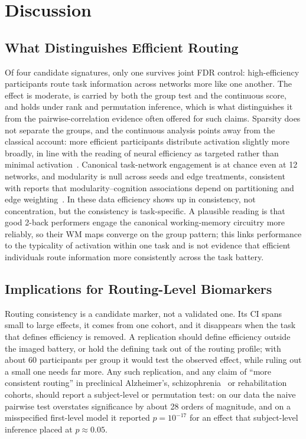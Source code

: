 \documentclass[conference]{IEEEtran}
\begin{document}
\section{Discussion}

\subsection{What Distinguishes Efficient Routing}

Of four candidate signatures, only one survives joint FDR control: high-efficiency participants route task information across networks more like one another. The effect is moderate, is carried by both the group test and the continuous score, and holds under rank and permutation inference, which is what distinguishes it from the pairwise-correlation evidence often offered for such claims. Sparsity does not separate the groups, and the continuous analysis points away from the classical account: more efficient participants distribute activation slightly more broadly, in line with the reading of neural efficiency as targeted rather than minimal activation~\cite{haier1988cortical,neubauer2009intelligence}. Canonical task-network engagement is at chance even at 12 networks, and modularity is null across seeds and edge treatments, consistent with reports that modularity--cognition associations depend on partitioning and edge weighting~\cite{gallen2019brain,arnemann2015functional}. In these data efficiency shows up in consistency, not concentration, but the consistency is task-specific. A plausible reading is that good 2-back performers engage the canonical working-memory circuitry more reliably, so their WM maps converge on the group pattern; this links performance to the typicality of activation within one task and is not evidence that efficient individuals route information more consistently across the task battery.

\subsection{Implications for Routing-Level Biomarkers}

Routing consistency is a candidate marker, not a validated one. Its CI spans small to large effects, it comes from one cohort, and it disappears when the task that defines efficiency is removed. A replication should define efficiency outside the imaged battery, or hold the defining task out of the routing profile; with about 60 participants per group it would test the observed effect, while ruling out a small one needs far more. Any such replication, and any claim of ``more consistent routing'' in preclinical Alzheimer's, schizophrenia~\cite{kim2010working,zhang2023dissociable,ewers2021segregation} or rehabilitation cohorts, should report a subject-level or permutation test: on our data the naive pairwise test overstates significance by about 28 orders of magnitude, and on a misspecified first-level model it reported $p = 10^{-17}$ for an effect that subject-level inference placed at $p \approx 0.05$.
\end{document}
